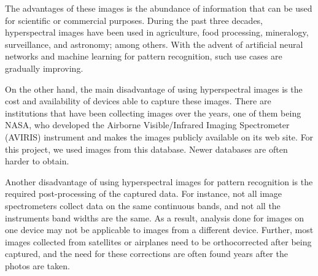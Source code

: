 \documentclass[letterpaper, 10 pt, conference]{ieeeconf}  %
\begin{document}
The advantages of these images is the abundance of information that can be used for scientific or commercial purposes. During the past three decades, hyperspectral images have been used in agriculture, food processing, mineralogy, surveillance, and astronomy; among others. With the advent of artificial neural networks and machine learning for pattern recognition, such use cases are gradually improving.

On the other hand, the main disadvantage of using hyperspectral images is the cost and availability of devices able to capture these images. There are institutions that have been collecting images over the years, one of them being NASA, who developed the Airborne Visible/Infrared Imaging Spectrometer (AVIRIS) instrument and makes the images publicly available on its web site. For this project, we used images from this database. Newer databases are often harder to obtain.

Another disadvantage of using hyperspectral images for pattern recognition is the required post-processing of the captured data. For instance, not all image spectrometers collect data on the same continuous bands, and not all the instruments band widths are the same. As a result, analysis done for images on one device may not be applicable to images from a different device. Further, most images collected from satellites or airplanes need to be orthocorrected after being captured, and the need for these corrections are often found years after the photos are taken.  
\end{document}
